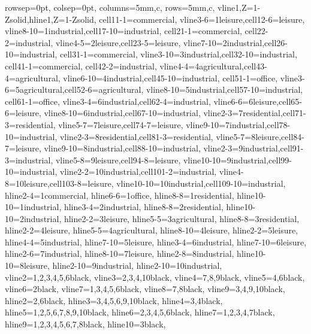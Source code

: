 \documentclass[margin=3mm]{standalone}
\begin{document}
\begin{tblr}{
rowsep=0pt, colsep=0pt, columns={5mm,c}, rows={5mm,c},
vline{1,Z}={1-Z}{solid},hline{1,Z}={1-Z}{solid},
cell{1}{1-1}={}{commercial}, vline{3-6}={1}{leisure},cell{1}{2-6}={}{leisure}, vline{8-10}={1}{industrial},cell{1}{7-10}={}{industrial}, cell{2}{1-1}={}{commercial}, cell{2}{2-2}={}{industrial}, vline{4-5}={2}{leisure},cell{2}{3-5}={}{leisure}, vline{7-10}={2}{industrial},cell{2}{6-10}={}{industrial}, cell{3}{1-1}={}{commercial}, vline{3-10}={3}{industrial},cell{3}{2-10}={}{industrial}, cell{4}{1-1}={}{commercial}, cell{4}{2-2}={}{industrial}, vline{4-4}={4}{agricultural},cell{4}{3-4}={}{agricultural}, vline{6-10}={4}{industrial},cell{4}{5-10}={}{industrial}, cell{5}{1-1}={}{office}, vline{3-6}={5}{agricultural},cell{5}{2-6}={}{agricultural}, vline{8-10}={5}{industrial},cell{5}{7-10}={}{industrial}, cell{6}{1-1}={}{office}, vline{3-4}={6}{industrial},cell{6}{2-4}={}{industrial}, vline{6-6}={6}{leisure},cell{6}{5-6}={}{leisure}, vline{8-10}={6}{industrial},cell{6}{7-10}={}{industrial}, vline{2-3}={7}{residential},cell{7}{1-3}={}{residential}, vline{5-7}={7}{leisure},cell{7}{4-7}={}{leisure}, vline{9-10}={7}{industrial},cell{7}{8-10}={}{industrial}, vline{2-3}={8}{residential},cell{8}{1-3}={}{residential}, vline{5-7}={8}{leisure},cell{8}{4-7}={}{leisure}, vline{9-10}={8}{industrial},cell{8}{8-10}={}{industrial}, vline{2-3}={9}{industrial},cell{9}{1-3}={}{industrial}, vline{5-8}={9}{leisure},cell{9}{4-8}={}{leisure}, vline{10-10}={9}{industrial},cell{9}{9-10}={}{industrial}, vline{2-2}={10}{industrial},cell{10}{1-2}={}{industrial}, vline{4-8}={10}{leisure},cell{10}{3-8}={}{leisure}, vline{10-10}={10}{industrial},cell{10}{9-10}={}{industrial}, hline{2-4}={1}{commercial}, hline{6-6}={1}{office}, hline{8-8}={1}{residential}, hline{10-10}={1}{industrial}, hline{3-4}={2}{industrial}, hline{8-8}={2}{residential}, hline{10-10}={2}{industrial}, hline{2-2}={3}{leisure}, hline{5-5}={3}{agricultural}, hline{8-8}={3}{residential}, hline{2-2}={4}{leisure}, hline{5-5}={4}{agricultural}, hline{8-10}={4}{leisure}, hline{2-2}={5}{leisure}, hline{4-4}={5}{industrial}, hline{7-10}={5}{leisure}, hline{3-4}={6}{industrial}, hline{7-10}={6}{leisure}, hline{2-6}={7}{industrial}, hline{8-10}={7}{leisure}, hline{2-8}={8}{industrial}, hline{10-10}={8}{leisure}, hline{2-10}={9}{industrial}, hline{2-10}={10}{industrial}, 
vline{2}={1,2,3,4,5,6}{black}, vline{3}={2,3,4,10}{black}, vline{4}={7,8,9}{black}, vline{5}={4,6}{black}, vline{6}={2}{black}, vline{7}={1,3,4,5,6}{black}, vline{8}={7,8}{black}, vline{9}={3,4,9,10}{black}, hline{2}={2,6}{black}, hline{3}={3,4,5,6,9,10}{black}, hline{4}={3,4}{black}, hline{5}={1,2,5,6,7,8,9,10}{black}, hline{6}={2,3,4,5,6}{black}, hline{7}={1,2,3,4,7}{black}, hline{9}={1,2,3,4,5,6,7,8}{black}, hline{10}={3}{black}, 
}
\end{tblr}
\end{document}
